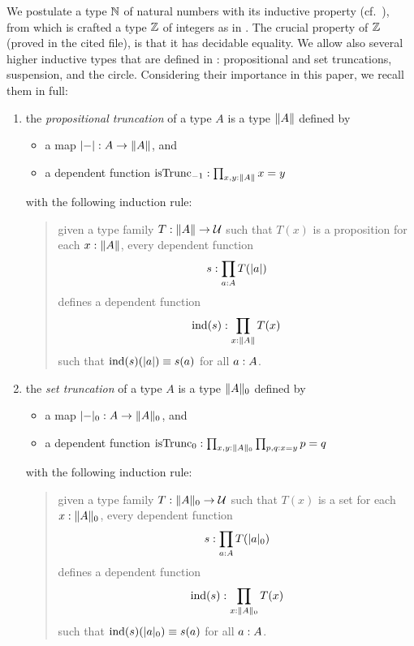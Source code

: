\documentclass[english,a4paper]{lmcs}
\def\githubpath{\tt\small}
\begin{document}
We postulate a type $\mathbb{N}$ of natural numbers with its inductive property
(cf.~\cite[Chapter 1.9]{HoTT}), from which is crafted a type $\mathbb{Z}$ of integers
as in \cite[\githubpath core/lib/types/Int.agda]{hott-agda}. The crucial
property of $\mathbb{Z}$ (proved in the cited file), is that it has decidable
equality. We allow also several higher inductive types that are defined in
\cite{HoTT}: propositional and set truncations, suspension, and the circle.
Considering their importance in this paper, we recall them in full:
\begin{enumerate}
\item the \emph{propositional truncation} of a type $A$ is a type $\lVert A\rVert$
  defined by
  \begin{itemize}
  \item a map $\lvert\mathord{{-}}\rvert : A \to \lVert A\rVert$, and
  \item a dependent function
    $\mathrm{isTrunc}_{-1} : \prod_{x,y: \lVert A\rVert} x=y$
  \end{itemize}
  with the following induction rule:
  \begin{quote}
    given a type family $T: \lVert A\rVert \to \mathcal{U}$ such that
    $T(x)$ is a proposition for each $x: \lVert A\rVert$, every
    dependent function
    \begin{displaymath}
      s: \prod_{a: A}T(\lvert a\rvert)
    \end{displaymath}
    defines a dependent function
    \begin{displaymath}
      \operatorname{\mathrm{ind}}(s):\prod_{x: \lVert A\rVert} T(x)
    \end{displaymath}
    such that $\operatorname{\mathrm{ind}}(s)(\lvert a\rvert) \equiv s(a)$ for all $a: A$.
  \end{quote}
\item the \emph{set truncation} of a type $A$ is a type $\lVert A\rVert_0$
  defined by
  \begin{itemize}
  \item a map $\lvert\mathord{{-}}\rvert_0 : A \to \lVert A\rVert_0$, and
  \item a dependent function
    $\mathrm{isTrunc}_{0} : \prod_{x,y: \lVert A\rVert_0}\prod_{p,q: x=y} p = q$
  \end{itemize}
  with the following induction rule:
  \begin{quote}
    given a type family $T: \lVert A\rVert_0 \to \mathcal{U}$ such that
    $T(x)$ is a set for each $x: \lVert A\rVert_0$, every
    dependent function
    \begin{displaymath}
      s: \prod_{a: A}T(\lvert a\rvert_0)
    \end{displaymath}
    defines a dependent function
    \begin{displaymath}
      \operatorname{\mathrm{ind}}(s):\prod_{x: \lVert A\rVert_0} T(x)
    \end{displaymath}
    such that $\operatorname{\mathrm{ind}}(s)(\lvert a\rvert_0) \equiv s(a)$ for all $a: A$.
  \end{quote}


\end{enumerate}
\end{document}
